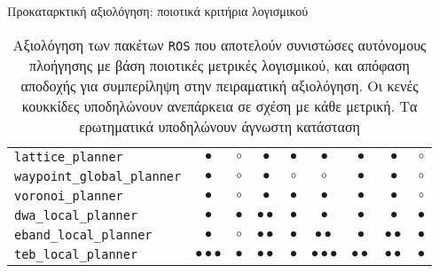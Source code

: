 \begin{frame}{Προκαταρκτική αξιολόγηση: ποιοτικά κριτήρια λογισμικού}
{\begin{table}[h]
\begin{tabular}{lccccccc|c}
  \textcolor{gr}{\texttt{lattice\_planner}}          &\textcolor{gr}{$\bullet$}                 & \textcolor{gr}{$\circ$}     & \textcolor{gr}{$\bullet$}         & \textcolor{gr}{$\bullet$} & \textcolor{gr}{$\bullet$}               & \textcolor{gr}{$\bullet$}        & \textcolor{gr}{$\bullet$}               & \textcolor{gr}{$\circ$}      \\
  \textcolor{gr}{\texttt{waypoint\_global\_planner}} &\textcolor{gr}{$\bullet$}                 & \textcolor{gr}{$\circ$}     & \textcolor{gr}{$\bullet$}         & \textcolor{gr}{$\circ$}   & \textcolor{gr}{$\circ$}                 & \textcolor{gr}{$\bullet$}        & \textcolor{gr}{$\bullet$}               & \textcolor{gr}{$\circ$}      \\
  \textcolor{gr}{ \texttt{voronoi\_planner}}         &\textcolor{gr}{$\bullet$}                 & \textcolor{gr}{$\circ$}     & \textcolor{gr}{$\bullet$}         & \textcolor{gr}{$\bullet$} & \textcolor{gr}{$\bullet$}               & \textcolor{gr}{$\bullet$}        & \textcolor{gr}{$\bullet$}               & \textcolor{gr}{$\circ$}      \\ \midrule
  \texttt{dwa\_local\_planner}                       & $\bullet$                 & $\bullet$   & $\bullet\bullet$  & $\bullet$ & $\bullet$               & $\bullet$        & $\bullet$               & $\bullet$    \\
  \texttt{eband\_local\_planner}                     & $\bullet$                 & $\circ$     & $\bullet\bullet$  & $\bullet$ & $\bullet\bullet$        & $\bullet$        & $\bullet\bullet$        & $\bullet$    \\
  \texttt{teb\_local\_planner}                       & $\bullet\bullet\bullet$   & $\bullet$   & $\bullet\bullet$  & $\bullet$ & $\bullet\bullet\bullet$ & $\bullet\bullet$ & $\bullet\bullet$        & $\bullet$    \\ \bottomrule
\end{tabular}
\caption{\tiny Αξιολόγηση των πακέτων \texttt{ROS} που αποτελούν
         συνιστώσες αυτόνομους πλοήγησης με βάση ποιοτικές μετρικές
         λογισμικού, και απόφαση αποδοχής για συμπερίληψη στην πειραματική
         αξιολόγηση. Οι κενές κουκκίδες υποδηλώνουν ανεπάρκεια σε σχέση με
         κάθε μετρική. Τα ερωτηματικά υποδηλώνουν άγνωστη κατάσταση}
\end{table}
}


\end{frame}
